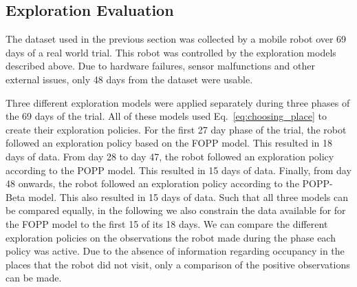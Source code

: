 \subsection*{Exploration Evaluation}

The dataset used in the previous section was collected by a mobile robot over 69 days of a real world trial. This robot was controlled by the exploration models described above. Due to hardware failures, sensor malfunctions and other external issues, only 48 days from the dataset were usable.

Three different exploration models were applied separately during three phases of the 69 days of the trial. All of these models used Eq.~\ref{eq:choosing_place} to create their exploration policies. For the first 27 day phase of the trial, the robot followed an exploration policy based on the FOPP model. This resulted in 18 days of data. From day 28 to day 47, the robot followed an exploration policy according to the POPP model. This resulted in 15 days of data. Finally, from day 48 onwards, the robot followed an exploration policy according to the POPP-Beta model. This also resulted in 15 days of data. 
% 
Such that all three models can be compared equally, in the following we also constrain the data available for for the FOPP model to the first 15 of its 18 days.
% 
% 
We can compare the different exploration policies on the observations the robot made during the phase each policy was active. Due to the absence of information regarding occupancy in the places that the robot did not visit, only a comparison of the positive observations can be made. 


